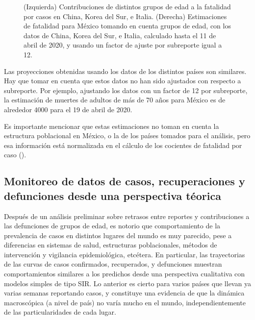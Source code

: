\documentclass[8pt]{article}
\begin{document}
\begin{figure}[h]
\begin{minipage}{0.5\textwidth}
\end{minipage}
\caption{(Izquierda) Contribuciones de distintos grupos de edad a la fatalidad por casos en China, Korea del Sur, e Italia. (Derecha) Estimaciones de fatalidad para México tomando en cuenta grupos de edad, con los datos de China, Korea del Sur, e Italia, calculado hasta el 11 de abril de 2020, y usando un factor de ajuste por subreporte igual a 12. }\label{fig:estimates}
\end{figure}

Las proyecciones obtenidas usando los datos de los distintos países son similares. Hay que tomar en cuenta que estos datos no han sido ajustados con respecto a subreporte. Por ejemplo, ajustando los datos con un factor de 12 por subreporte, la estimación de  muertes de adultos de más de 70 años para México es  de alrededor 4000 para el 19 de abril de 2020. 


Es importante mencionar que estas estimaciones no toman en cuenta la estructura poblacional en México, o la de los países tomados para el análisis, pero esa información está normalizada en el cálculo de los cocientes de fatalidad por caso (). 






\subsection*{Monitoreo de datos de casos, recuperaciones y defunciones desde una perspectiva téorica} 



Después de un análisis preliminar sobre retrasos entre reportes y contribuciones a las defunciones de grupos de edad, es notorio que comportamiento de la prevalencia de casos en distintos lugares del mundo es muy parecido, pese a diferencias en sistemas de salud, estructuras poblacionales, métodos de intervención y vigilancia epidemiológica, etcétera. En particular, las trayectorias de las curvas de casos confirmados, recuperados, y defunciones muestran comportamientos similares a los predichos desde una perspectiva cualitativa con modelos simples de tipo SIR. Lo anterior es cierto para varios países que llevan ya varias semanas reportando casos, y constituye una evidencia de que la dinámica macroscópica (a nivel de país) no varía mucho en el mundo, independientemente de las particularidades de cada lugar. 
\end{document}
